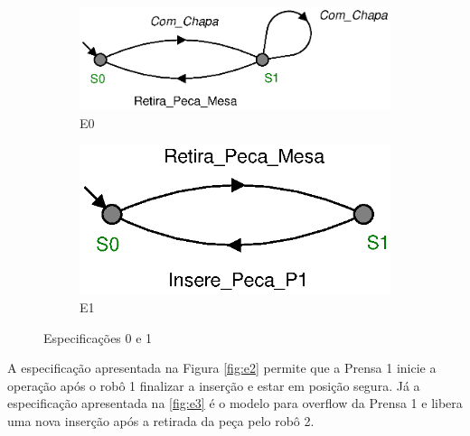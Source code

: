 \begin{figure}[H]%
  \centering
  \begin{subfigure}[b]{0.45\textwidth}
      \centering
      \includegraphics[width=\textwidth]{imagens/E0.eps}
      \caption{E0}
      \label{fig:e0}
  \end{subfigure}
  \hfill
  \begin{subfigure}[b]{0.45\textwidth}
      \centering
      \includegraphics[width=\textwidth]{imagens/E1.eps}
      \caption{E1}
      \label{fig:e1}
  \end{subfigure}
  \caption{Especificações 0 e 1}
  \label{fig:e01}
\end{figure}

A especificação apresentada na Figura \ref{fig:e2} permite que a Prensa 1 inicie a operação após o robô 1 finalizar a inserção e estar em posição segura.
Já a especificação apresentada na \ref{fig:e3} é o modelo para overflow da Prensa 1 e libera uma nova inserção após a retirada da peça pelo robô 2.

